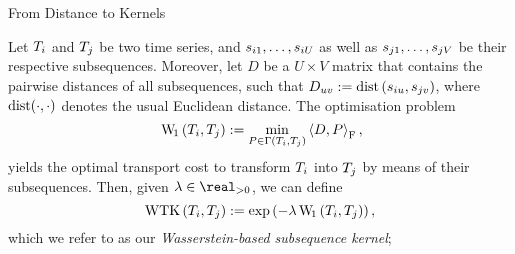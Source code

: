 \begin{frame}{From Distance to Kernels}
  \begin{definition}
  \normalsize
  Let $T_i$ and $T_j$ be two time series, and $s_{i1}, \dots, s_{iU}$
  as well as $s_{j1}, \dots, s_{jV}$ be their respective
  subsequences. Moreover, let $D$ be a $U \times V$ matrix that contains
  the pairwise distances of all subsequences, such that
  $D_{uv} := \operatorname{dist}\left(s_{iu}, s_{jv}\right)$,
  where $\operatorname{dist}(\cdot, \cdot)$ denotes the usual Euclidean distance.
  The optimisation problem
  \begin{equation}\
   \operatorname{W\!}_1\left(T_i, T_j\right) := \min_{P \in \Gamma\left(T_i, T_j\right)} \left\langle D, P \right\rangle_{\mathrm{F}},
    \label{eq:Our distance}
  \end{equation}
  yields the optimal transport cost to transform $T_i$
  into $T_j$ by means of their subsequences. Then, given
  $\lambda\in\real_{> 0}$, we can define
  \begin{equation}
    \operatorname{WTK}\left(T_i, T_j\right) := \exp\left(-\lambda \operatorname{W\!}_1\left(T_i, T_j\right)\right),
    \label{eq:Our kernel}
  \end{equation}
  which we refer to as our \emph{Wasserstein-based subsequence kernel};
  \end{definition}
\end{frame}



\renewcommand{\algorithmicrequire}{\textbf{Input:}}
\renewcommand{\algorithmicensure}{\textbf{Output:}}
\renewcommand{\algorithmiccomment}[1]{\qquad \textcolor{ETHf}{//} \textcolor{ETHf}{#1}}

